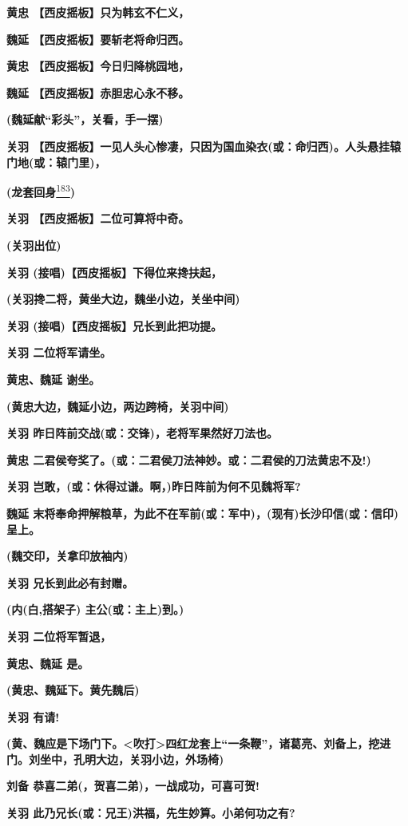 \textbf{黄忠 【西皮摇板】只为韩玄不仁义，}

\textbf{魏延 【西皮摇板】要斩老将命归西。}

\textbf{黄忠 【西皮摇板】今日归降桃园地，}

\textbf{魏延 【西皮摇板】赤胆忠心永不移。}

\textbf{(魏延献``彩头''，关看，手一摆)}

\textbf{关羽
【西皮摇板】一见人头心惨凄，只因为国血染衣(或：命归西)。人头悬挂辕门地(或：辕门里)，}

\textbf{(龙套回身}\protect\hyperlink{fn183}{\textsuperscript{183}}\textbf{)}

\textbf{关羽 【西皮摇板】二位可算将中奇。}

\textbf{(关羽出位)}

\textbf{关羽 (接唱)【西皮摇板】下得位来搀扶起，}

\textbf{(关羽搀二将，黄坐大边，魏坐小边，关坐中间)}

\textbf{关羽 (接唱)【西皮摇板】兄长到此把功提。}

\textbf{关羽 二位将军请坐。}

\textbf{黄忠、魏延 谢坐。}

\textbf{(黄忠大边，魏延小边，两边跨椅，关羽中间)}

\textbf{关羽 昨日阵前交战(或：交锋)，老将军果然好刀法也。}

\textbf{黄忠
二君侯夸奖了。(或：二君侯刀法神妙。或：二君侯的刀法黄忠不及!)}

\textbf{关羽 岂敢，(或：休得过谦。啊，)昨日阵前为何不见魏将军?}

\textbf{魏延
末将奉命押解粮草，为此不在军前(或：军中)，(现有)长沙印信(或：信印)呈上。}

\textbf{(魏交印，关拿印放袖内)}

\textbf{关羽 兄长到此必有封赠。}

\textbf{(内(白,搭架子) 主公(或：主上)到。)}

\textbf{关羽 二位将军暂退，}

\textbf{黄忠、魏延 是。}

\textbf{(黄忠、魏延下。黄先魏后)}

\textbf{关羽 有请!}

\textbf{(黄、魏应是下场门下。\textless{}吹打\textgreater{}四红龙套上``一条鞭''，诸葛亮、刘备上，挖进门。刘坐中，孔明大边，关羽小边，外场椅)}

\textbf{刘备 恭喜二弟(，贺喜二弟)，一战成功，可喜可贺!}

\textbf{关羽 此乃兄长(或：兄王)洪福，先生妙算。小弟何功之有?}

